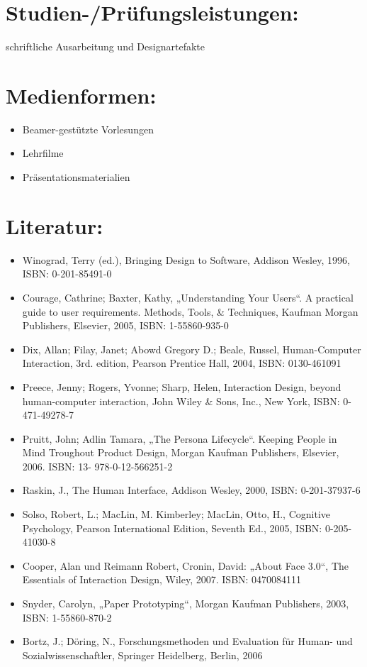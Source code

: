 \section*{Studien-/Prüfungsleistungen:}\label{studien-pruxfcfungsleistungen-5}

schriftliche Ausarbeitung und Designartefakte

\section*{Medienformen:}\label{medienformen-5}

\begin{itemize}
\item
  Beamer-gestützte Vorlesungen
\item
  Lehrfilme
\item
  Präsentationsmaterialien
\end{itemize}

\section*{Literatur:}\label{literatur-5}

\begin{itemize}
\item
  Winograd, Terry (ed.), Bringing Design to Software, Addison Wesley,
  1996, ISBN: 0-201-85491-0
\item
  Courage, Cathrine; Baxter, Kathy, „Understanding Your Users``. A
  practical guide to user requirements. Methods, Tools, \& Techniques,
  Kaufman Morgan Publishers, Elsevier, 2005, ISBN: 1-55860-935-0
\item
  Dix, Allan; Filay, Janet; Abowd Gregory D.; Beale, Russel,
  Human-Computer Interaction, 3rd. edition, Pearson Prentice Hall, 2004,
  ISBN: 0130-461091
\item
  Preece, Jenny; Rogers, Yvonne; Sharp, Helen, Interaction Design,
  beyond human-computer interaction, John Wiley \& Sons, Inc., New York,
  ISBN: 0-471-49278-7
\item
  Pruitt, John; Adlin Tamara, „The Persona Lifecycle``. Keeping People
  in Mind Troughout Product Design, Morgan Kaufman Publishers, Elsevier,
  2006. ISBN: 13- 978-0-12-566251-2
\item
  Raskin, J., The Human Interface, Addison Wesley, 2000, ISBN:
  0-201-37937-6
\item
  Solso, Robert, L.; MacLin, M. Kimberley; MacLin, Otto, H., Cognitive
  Psychology, Pearson International Edition, Seventh Ed., 2005, ISBN:
  0-205-41030-8
\item
  Cooper, Alan und Reimann Robert, Cronin, David: „About Face 3.0``, The
  Essentials of Interaction Design, Wiley, 2007. ISBN: 0470084111
\item
  Snyder, Carolyn, „Paper Prototyping``, Morgan Kaufman Publishers,
  2003, ISBN: 1-55860-870-2
\item
  Bortz, J.; Döring, N., Forschungsmethoden und Evaluation für Human-
  und Sozialwissenschaftler, Springer Heidelberg, Berlin, 2006
\end{itemize}

